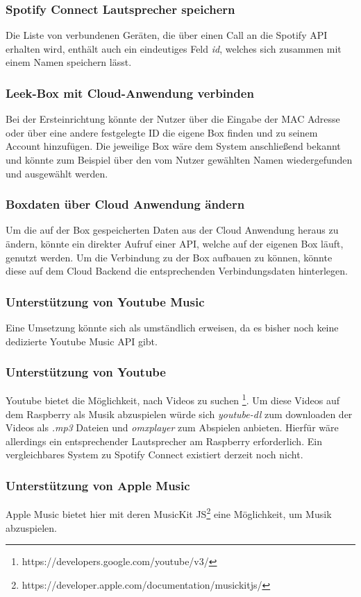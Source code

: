 \documentclass[10pt, a4paper]{article}
\begin{document}
\begin{onehalfspace}
\subsubsection{Spotify Connect Lautsprecher speichern}
Die Liste von verbundenen Geräten, die über einen Call an die Spotify API erhalten wird, enthält auch ein eindeutiges Feld \textit{id}, welches sich zusammen mit einem Namen speichern lässt.

\subsubsection{Leek-Box mit Cloud-Anwendung verbinden}
Bei der Ersteinrichtung könnte der Nutzer über die Eingabe der MAC Adresse oder über eine andere festgelegte ID die eigene Box finden und zu seinem Account hinzufügen. Die jeweilige Box wäre dem System anschließend bekannt und könnte zum Beispiel über den vom Nutzer gewählten Namen wiedergefunden und ausgewählt werden.

\subsubsection{Boxdaten über Cloud Anwendung ändern}
Um die auf der Box gespeicherten Daten aus der Cloud Anwendung heraus zu ändern, könnte ein direkter Aufruf einer API, welche auf der eigenen Box läuft, genutzt werden. Um die Verbindung zu der Box aufbauen zu können, könnte diese auf dem Cloud Backend die entsprechenden Verbindungsdaten hinterlegen.
\subsubsection{Unterstützung von Youtube Music}
Eine Umsetzung könnte sich als umständlich erweisen, da es bisher noch keine dedizierte Youtube Music API gibt.

\subsubsection{Unterstützung von Youtube}
Youtube bietet die Möglichkeit, nach Videos zu suchen \footnote{https://developers.google.com/youtube/v3/}. Um diese Videos auf dem Raspberry als Musik abzuspielen würde sich \textit{youtube-dl} zum downloaden der Videos als \textit{.mp3} Dateien und \textit{omxplayer} zum Abspielen anbieten.
Hierfür wäre allerdings ein entsprechender Lautsprecher am Raspberry erforderlich. Ein vergleichbares System zu Spotify Connect existiert derzeit noch nicht.

\subsubsection{Unterstützung von Apple Music}
Apple Music bietet hier mit deren MusicKit JS\footnote{https://developer.apple.com/documentation/musickitjs/} eine Möglichkeit, um Musik abzuspielen.


\end{onehalfspace}
\end{document}
